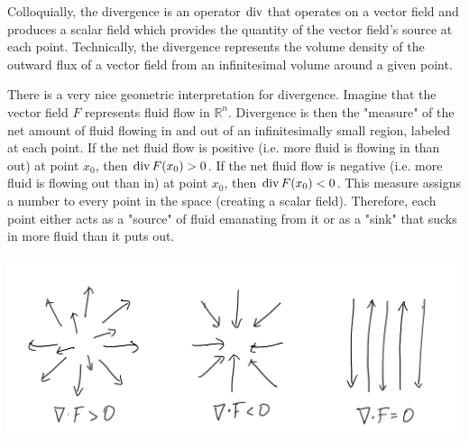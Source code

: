   Colloquially, the divergence is an operator $\Div$ that operates on a vector field and produces a scalar field which provides the quantity of the vector field's source at each point. Technically, the divergence represents the volume density of the outward flux of a vector field from an infinitesimal volume around a given point. 

  There is a very nice geometric interpretation for divergence. Imagine that the vector field $F$ represents fluid flow in $\mathbb{R}^n$. Divergence is then the "measure" of the net amount of fluid flowing in and out of an infinitesimally small region, labeled at each point. If the net fluid flow is positive (i.e. more fluid is flowing in than out) at point $x_0$, then $\Div{F}(x_0) > 0$. If the net fluid flow is negative (i.e. more fluid is flowing out than in) at point $x_0$, then $\Div{F}(x_0) < 0$. This measure assigns a number to every point in the space (creating a scalar field). Therefore, each point either acts as a "source" of fluid emanating from it or as a "sink" that sucks in more fluid than it puts out. 
  \begin{center}
      \includegraphics[scale=0.25]{img/Divergence_compared_to_Zero.PNG}
  \end{center}

